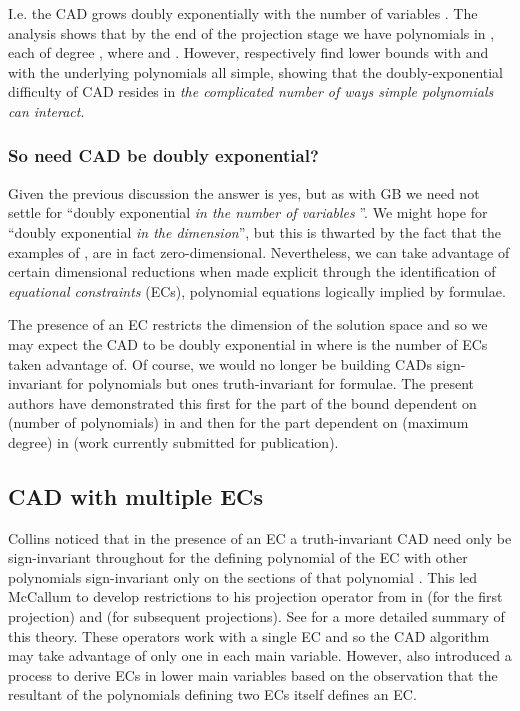 \documentclass{llncs}
\begin{document}
I.e. the CAD grows doubly exponentially with the number of variables .
The analysis shows that by the end of the projection stage we have  polynomials in , each of degree , where  and . 
However, \cite{DH88} \cite{BD07} respectively find lower bounds with  and  with the underlying polynomials all simple, showing that the doubly-exponential difficulty of CAD resides in \emph{the complicated number of ways simple polynomials can interact}. 

\subsubsection*{So need CAD be doubly exponential?}  Given the previous discussion the answer is yes, but as with GB we need not settle for ``doubly exponential \emph{in the number of variables} ''.  We might hope for ``doubly exponential \emph{in the dimension}'', but this is thwarted by the fact that the examples of  \cite{BD07},\cite{DH88} are in fact zero-dimensional.  Nevertheless, we can take advantage of certain dimensional reductions when made explicit through the identification of \emph{equational constraints} (ECs), polynomial equations logically implied by formulae.

The presence of an EC restricts the dimension of the solution space and so we may expect the CAD to be doubly exponential in  where  is the number of ECs taken advantage of.  
Of course, we would no longer be building CADs sign-invariant for polynomials but ones truth-invariant for formulae.   The present authors have demonstrated this first for the part of the bound dependent on  (number of polynomials) in \cite{EBD15} and then for the part dependent on  (maximum degree) in \cite{ED16} (work currently submitted for publication).


\subsection{CAD with multiple ECs}


Collins noticed that in the presence of an EC a truth-invariant CAD need only be sign-invariant throughout for the defining polynomial of the EC with other polynomials sign-invariant only on the sections of that polynomial \cite{Collins1998}. This led McCallum to develop restrictions to his projection operator from \cite{McCallum1998} in \cite{McCallum1999a} (for the first projection) and \cite{McCallum2001} (for subsequent projections).   See \cite[Section 2.1]{EBD15} for a more detailed summary of this theory.  These operators work with a single EC and so the CAD algorithm may take advantage of only one in each main variable.  
However, \cite{McCallum2001} also introduced a process to derive ECs in lower main variables based on the observation that the resultant of the polynomials defining two ECs itself defines an EC.  
\end{document}
